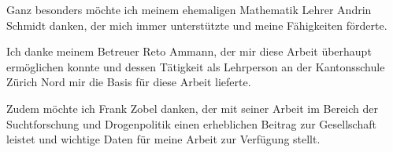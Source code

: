\documentclass[../main.tex]{subfiles}
\begin{document}
	\noindent
	Ganz besonders möchte ich meinem ehemaligen Mathematik Lehrer Andrin Schmidt danken, der mich immer unterstützte und meine Fähigkeiten förderte.
	
	\noindent
	Ich danke meinem Betreuer Reto Ammann, der mir diese Arbeit überhaupt ermöglichen konnte und dessen Tätigkeit als Lehrperson an der Kantonsschule Zürich Nord mir die Basis für diese Arbeit lieferte.
	
	\noindent
	Zudem möchte ich Frank Zobel danken, der mit seiner Arbeit im Bereich der Suchtforschung und Drogenpolitik einen erheblichen Beitrag zur Gesellschaft leistet und wichtige Daten für meine Arbeit zur Verfügung stellt.
	
\end{document}
